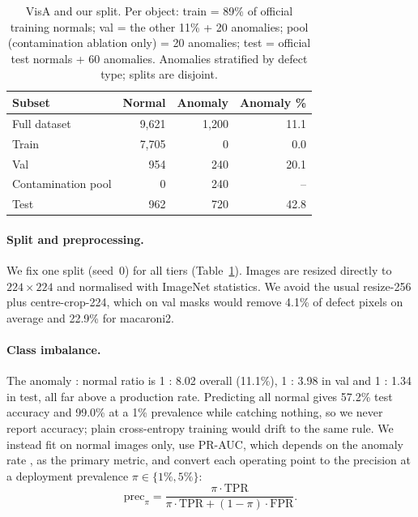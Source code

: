 \begin{table}[t]
  \centering
  \small
  \begin{tabular}{@{}lrrr@{}}
    \toprule
    Subset & Normal & Anomaly & Anomaly \% \\
    \midrule
    Full dataset       & 9,621 & 1,200 & 11.1 \\
    Train              & 7,705 &     0 &  0.0 \\
    Val                &   954 &   240 & 20.1 \\
    Contamination pool &     0 &   240 & -- \\
    Test               &   962 &   720 & 42.8 \\
    \bottomrule
  \end{tabular}
  \caption{VisA and our split. Per object: train = 89\% of official training normals; val = the other
    11\% + 20 anomalies; pool (contamination ablation only) = 20 anomalies; test = official test normals
    + 60 anomalies. Anomalies stratified by defect type; splits are disjoint.}
  \label{tab:data}
\end{table}

\paragraph{Split and preprocessing.}
We fix one split (seed~0) for all tiers (Table~\ref{tab:data}).
Images are resized directly to $224 \times 224$ and normalised with ImageNet statistics.
We avoid the usual resize-256 plus centre-crop-224, which on val masks would remove 4.1\% of defect
pixels on average and 22.9\% for macaroni2.

\paragraph{Class imbalance.}
The anomaly : normal ratio is 1 : 8.02 overall (11.1\%), 1 : 3.98 in val and 1 : 1.34 in test, all
far above a production rate.
Predicting all normal gives 57.2\% test accuracy and 99.0\% at a 1\% prevalence while catching nothing,
so we never report accuracy; plain cross-entropy training would drift to the same rule.
We instead fit on normal images only, use PR-AUC, which depends on the anomaly rate
\citep{davis2006relationship,saito2015precision}, as the primary metric, and convert each operating
point to the precision at a deployment prevalence $\pi \in \{1\%, 5\%\}$:
\begin{equation}
  \mathrm{prec}_\pi = \frac{\pi \cdot \mathrm{TPR}}{\pi \cdot \mathrm{TPR} + (1-\pi) \cdot \mathrm{FPR}}.
  \label{eq:prec-pi}
\end{equation}
